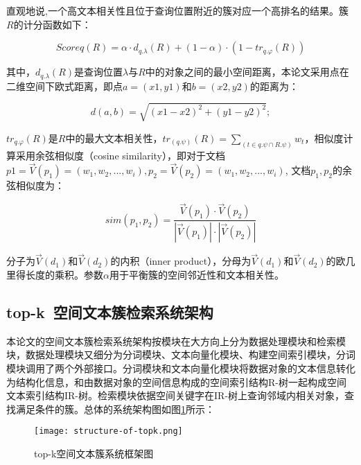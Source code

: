 直观地说,一个高文本相关性且位于查询位置附近的簇对应一个高排名的结果。簇$R$的计分函数如下：

\begin{equation}
	\label{evaluate}
	Scoreq(R) = \alpha\cdot d_{q.\lambda}(R)+(1-\alpha)\cdot (1-tr_{q.\varphi}(R))
\end{equation}

其中，$d_{q.\lambda}(R)$是查询位置$\lambda$与$R$中的对象之间的最小空间距离，本论文采用点在二维空间下欧式距离，即点$a = (x1, y1)$和$b = (x2, y2)$的距离为：

\begin{equation}
	\label{distance}
	d(a,b) = \sqrt{(x1-x2)^2 + (y1 - y2)^2};
\end{equation}

\newpage
$tr_{q.\varphi}(R)$是$R$中的最大文本相关性，$tr_(q.\psi)(R)=\sum_(t \in q.\psi \cap R.\psi)w_t $，相似度计算采用余弦相似度（cosine similarity），即对于文档$p1 = \vec{V}(p_1 ) = (w_1, w_2, ..., w_i), p_2 = \vec{V}(p_2) = (w_1, w_2, ..., w_i)$, 文档$p_1, p_2$的余弦相似度为：

\begin{equation}
	\label{simp1p2}
	sim(p_1, p_2) = \frac{\vec{V}(p_1) \cdot \vec{V}(p_2)}{\left| \vec{V}(p_1) \right| \cdot \left| \vec{V}(p_2) \right|} 
\end{equation}

分子为$\vec{V}(d_1)$和$\vec{V}(d_2)$的内积（inner product），分母为$\vec{V}(d_1)$和$\vec{V}(d_2)$的欧几里得长度的乘积。参数$\alpha$用于平衡簇的空间邻近性和文本相关性。


\subsection{top-k\ 空间文本簇检索系统架构}
本论文的空间文本簇检索系统架构按模块在大方向上分为数据处理模块和检索模块，数据处理模块又细分为分词模块、文本向量化模块、构建空间索引模块，分词模块调用了两个外部接口。分词模块和文本向量化模块将数据对象的文本信息转化为结构化信息，和由数据对象的空间信息构成的空间索引结构R-树一起构成空间文本索引结构IR-树。检索模块依据空间关键字在IR-树上查询邻域内相关对象，查找满足条件的簇。总体的系统架构图如图\ref{system_structure}所示：

\begin{figure}[htbp]
	\begin{center}
		\texttt{[image: structure-of-topk.png]}
		\caption{top-k空间文本簇系统框架图}
		\label{system_structure}
	\end{center}
\end{figure}

